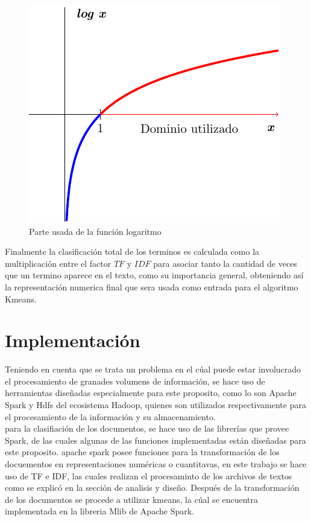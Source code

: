 \documentclass[conference,compsoc]{IEEEtran}
\begin{document}
\begin{figure}[H]
    \includegraphics[scale=1]{LogarithmPos.pdf}
    \caption{Parte usada de la función logaritmo}
    \label{fun:logpos}
\end{figure}

Finalmente la clasificación total de los terminos es calculada como la multiplicación
entre el factor $TF$ y $IDF$ para asociar tanto la cantidad de veces que un termino 
aparece en el texto, como su importancia general, obteniendo así la representación
numerica final que sera usada como entrada para el algoritmo Kmeans.

\section{Implementación}

Teniendo en cuenta que se trata un problema en el cúal puede estar involucrado
el procesamiento de granades volumens de información, se hace uso de
herramientas diseñadas especialmente para este proposito, como lo son Apache
Spark y Hdfs del ecosistema Hadoop, quienes son utilizados respectivamente para
el procesamiento de la información y su almacenamiento.\\

para la clasifiación de los documentos, se hace uso de las librerías que provee
Spark, de las cuales algunas de las funciones implementadas están diseñadas
para este proposito. apache spark posee funciones para la transformación de los
docuementos en representaciones numéricas o cuantitavas, en este trabajo se
hace uso de TF e IDF, las cuales realizan el procesaminto de los archivos de
textos como se explicó en la sección de analisis y diseño. Después de la
transformación de los documentos se procede a utilizar kmeans, la cúal se
encuentra implementada en la libreria Mlib de Apache Spark.\\
\end{document}
